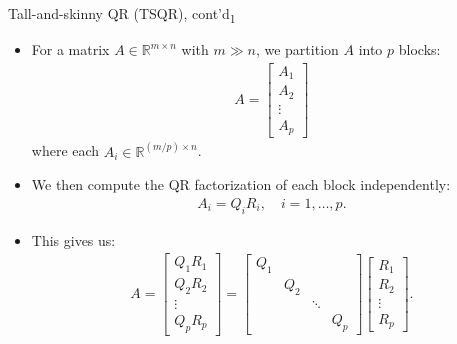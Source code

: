 \documentclass[t,usepdftitle=false]{beamer}
\begin{document}
\begin{frame}{Tall-and-skinny QR (TSQR), cont'd\textsubscript{1}}
\begin{itemize}
\item For a matrix $A\in\mathbb{R}^{m\times n}$ with $m\gg n$, we partition $A$ into $p$ blocks:
\begin{align*}
A = \begin{bmatrix}
A_1 \\
A_2 \\
\vdots \\
A_p
\end{bmatrix}
\end{align*}
where each $A_i \in \mathbb{R}^{(m/p) \times n}$.
\item We then compute the QR factorization of each block independently:
\begin{align*}
A_i=Q_i R_i,\quad i=1,\ldots,p.
\end{align*}
\item This gives us:
\begin{align*}
A = \begin{bmatrix}
Q_1 R_1 \\
Q_2 R_2 \\
\vdots \\
Q_p R_p
\end{bmatrix} = \begin{bmatrix}
Q_1 & & & \\
& Q_2 & & \\
& & \ddots & \\
& & & Q_p
\end{bmatrix} \begin{bmatrix}
R_1 \\
R_2 \\
\vdots \\
R_p
\end{bmatrix}.
\end{align*}
\end{itemize}
\end{frame}
\end{document}
